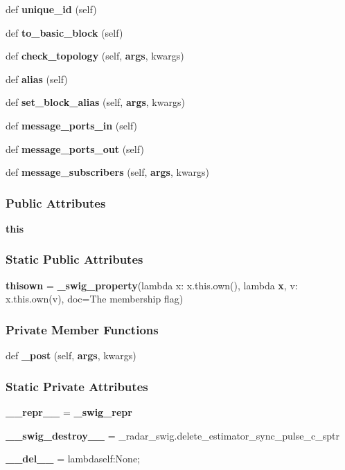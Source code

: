 \begin{DoxyCompactItemize}
def {\bf unique\+\_\+id} (self)
\item 
def {\bf to\+\_\+basic\+\_\+block} (self)
\item 
def {\bf check\+\_\+topology} (self, {\bf args}, kwargs)
\item 
def {\bf alias} (self)
\item 
def {\bf set\+\_\+block\+\_\+alias} (self, {\bf args}, kwargs)
\item 
def {\bf message\+\_\+ports\+\_\+in} (self)
\item 
def {\bf message\+\_\+ports\+\_\+out} (self)
\item 
def {\bf message\+\_\+subscribers} (self, {\bf args}, kwargs)
\end{DoxyCompactItemize}
\subsubsection*{Public Attributes}
\begin{DoxyCompactItemize}
\item 
{\bf this}
\end{DoxyCompactItemize}
\subsubsection*{Static Public Attributes}
\begin{DoxyCompactItemize}
\item 
{\bf thisown} = {\bf \+\_\+swig\+\_\+property}(lambda x\+: x.\+this.\+own(), lambda {\bf x}, v\+: x.\+this.\+own(v), doc=\textquotesingle{}The membership flag\textquotesingle{})
\end{DoxyCompactItemize}
\subsubsection*{Private Member Functions}
\begin{DoxyCompactItemize}
\item 
def {\bf \+\_\+post} (self, {\bf args}, kwargs)
\end{DoxyCompactItemize}
\subsubsection*{Static Private Attributes}
\begin{DoxyCompactItemize}
\item 
{\bf \+\_\+\+\_\+repr\+\_\+\+\_\+} = {\bf \+\_\+swig\+\_\+repr}
\item 
{\bf \+\_\+\+\_\+swig\+\_\+destroy\+\_\+\+\_\+} = \+\_\+radar\+\_\+swig.\+delete\+\_\+estimator\+\_\+sync\+\_\+pulse\+\_\+c\+\_\+sptr
\item 
{\bf \+\_\+\+\_\+del\+\_\+\+\_\+} = lambdaself\+:\+None;
\end{DoxyCompactItemize}


